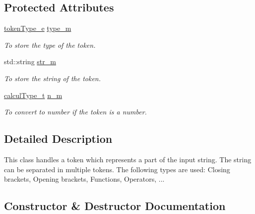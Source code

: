 \subsection*{Protected Attributes}
\begin{DoxyCompactItemize}
\item 
\hypertarget{class_token_a881316b1f7990524969817f25f80feae}{}\hyperlink{class_token_a706d105bff3282a406a9b218fcee1bfc}{token\+Type\+\_\+e} \hyperlink{class_token_a881316b1f7990524969817f25f80feae}{type\+\_\+m}\label{class_token_a881316b1f7990524969817f25f80feae}

\begin{DoxyCompactList}\small\item\em To store the type of the token. \end{DoxyCompactList}\item 
\hypertarget{class_token_a2781f7d67fae2fa1cbfe4af5caf8473d}{}std\+::string \hyperlink{class_token_a2781f7d67fae2fa1cbfe4af5caf8473d}{str\+\_\+m}\label{class_token_a2781f7d67fae2fa1cbfe4af5caf8473d}

\begin{DoxyCompactList}\small\item\em To store the string of the token. \end{DoxyCompactList}\item 
\hypertarget{class_token_ad881272523473f67bbeaecac8a99173a}{}\hyperlink{mpfr_interface_8h_a993860352aef57b15399903c4475a608}{calcul\+Type\+\_\+t} \hyperlink{class_token_ad881272523473f67bbeaecac8a99173a}{n\+\_\+m}\label{class_token_ad881272523473f67bbeaecac8a99173a}

\begin{DoxyCompactList}\small\item\em To convert to number if the token is a number. \end{DoxyCompactList}\end{DoxyCompactItemize}


\subsection{Detailed Description}
This class handles a token which represents a part of the input string. The string can be separated in multiple tokens. The following types are used\+: Closing brackets, Opening brackets, Functions, Operators, ... 

\subsection{Constructor \& Destructor Documentation}
\hypertarget{class_token_ad84c27d6c4587fd359ffa52004bd370b}{}
